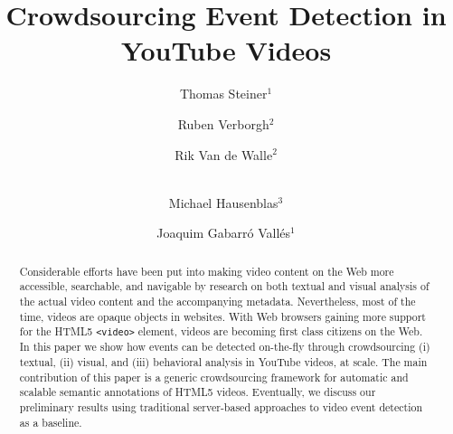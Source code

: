 \documentclass[runningheads,a4paper]{llncs}
\begin{document}
\mainmatter

\title{Crowdsourcing Event Detection in YouTube Videos}


%
%
\author{Thomas Steiner$^{1}$ \and Ruben Verborgh$^{2}$ \and Rik Van de Walle$^{2}$ \and \\Michael Hausenblas$^{3}$ \and Joaquim Gabarr\'{o} Vall\'{e}s$^{1}$}
%

\maketitle

\begin{abstract}
Considerable efforts have been put into making video content on the Web more accessible, searchable, and navigable by research on both textual and visual analysis of the actual video content and the accompanying metadata. Nevertheless, most of the time, videos are opaque objects in websites. With Web browsers gaining more support for the HTML5 \texttt{<video>} element, videos are becoming first class citizens on the Web. In this paper we show how events can be detected on-the-fly through crowdsourcing (i) textual, (ii) visual, and (iii) behavioral analysis in YouTube videos, at scale. The main contribution of this paper is a generic crowdsourcing framework for automatic and scalable semantic annotations of HTML5 videos. Eventually, we discuss our preliminary results using traditional server-based approaches to video event detection as a baseline. 
\end{abstract}
\end{document}

